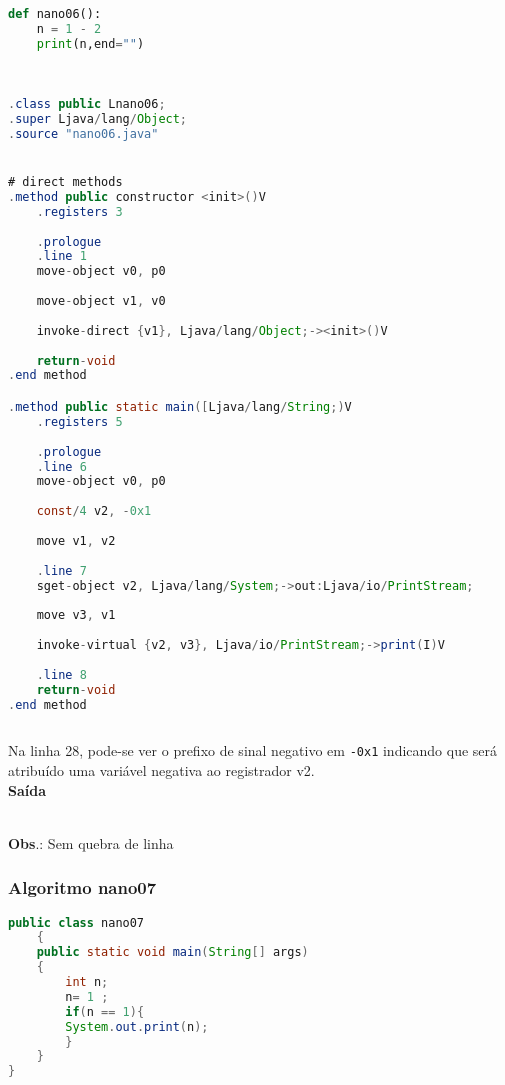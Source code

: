 \documentclass[hidelinks,12pt]{article}
\begin{document}
	\begin{lstlisting}[caption=Código em python,language=Python]
def nano06():
	n = 1 - 2 
	print(n,end="")

	
	\end{lstlisting}
	
	\begin{lstlisting}[caption=Smali resultante do .java,language=java]
.class public Lnano06;
.super Ljava/lang/Object;
.source "nano06.java"


# direct methods
.method public constructor <init>()V
	.registers 3
	
	.prologue
	.line 1
	move-object v0, p0
	
	move-object v1, v0
	
	invoke-direct {v1}, Ljava/lang/Object;-><init>()V
	
	return-void
.end method

.method public static main([Ljava/lang/String;)V
	.registers 5
	
	.prologue
	.line 6
	move-object v0, p0
	
	const/4 v2, -0x1
	
	move v1, v2
	
	.line 7
	sget-object v2, Ljava/lang/System;->out:Ljava/io/PrintStream;
	
	move v3, v1
	
	invoke-virtual {v2, v3}, Ljava/io/PrintStream;->print(I)V
	
	.line 8
	return-void
.end method	
	
	\end{lstlisting}
	
	Na linha 28, pode-se ver o prefixo de sinal negativo em \texttt{-0x1} indicando que será atribuído uma variável negativa ao registrador v2.\\
	

	
{\large{\textbf{Saída}}}

\noindent{}\\	

\textbf{Obs}.: Sem quebra de linha\\
	
	\subsubsection{Algoritmo nano07}
	
	\begin{lstlisting}[caption=Código em Java,language=java]
public class nano07
	{
	public static void main(String[] args)
	{
		int n;
		n= 1 ;
		if(n == 1){
		System.out.print(n);
		}
	}
}	
	
	\end{lstlisting}
	
\end{document}
